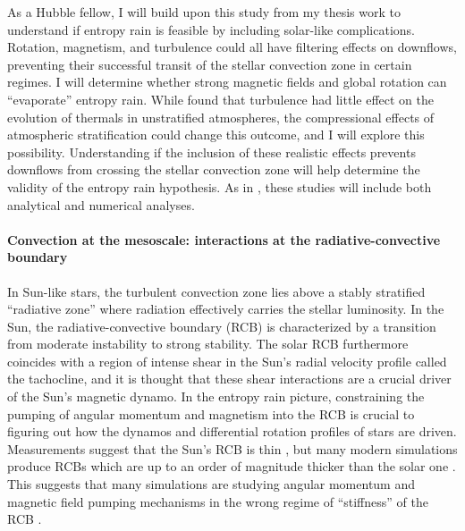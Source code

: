 \documentclass[preprint, hmargin=1in, vmargin=1in]{aastex62}
\begin{document}
As a Hubble fellow, I will build upon this study from my thesis work to understand if entropy rain is feasible by including solar-like complications.
Rotation, magnetism, and turbulence could all have filtering effects on downflows, preventing their successful transit of the stellar convection zone in certain regimes.
I will determine whether strong magnetic fields and global rotation can ``evaporate'' entropy rain.
While \citet{lecoanet&jeevanjee2019} found that turbulence had little effect on the evolution of thermals in unstratified atmospheres, the compressional effects of atmospheric stratification could change this outcome, and I will explore this possibility.
Understanding if the inclusion of these realistic effects prevents downflows from crossing the stellar convection zone will help determine the validity of the entropy rain hypothesis.
As in \citet{andersLB2019}, these studies will include both analytical and numerical analyses.

\paragraph{Convection at the mesoscale: interactions at the radiative-convective boundary}
In Sun-like stars, the turbulent convection zone lies above a stably stratified ``radiative zone'' where radiation effectively carries the stellar luminosity.
In the Sun, the radiative-convective boundary (RCB) is characterized by a transition from moderate instability to strong stability.
The solar RCB furthermore coincides with a region of intense shear in the Sun's radial velocity profile called the tachocline, and it is thought that these shear interactions are a crucial driver of the Sun's magnetic dynamo.
In the entropy rain picture, constraining the pumping of angular momentum and magnetism into the RCB is crucial to figuring out how the dynamos and differential rotation profiles of stars are driven.
Measurements suggest that the Sun's RCB is thin \citep{basu1997}, but many modern simulations produce RCBs which are up to an order of magnitude thicker than the solar one \citep{hotta2017}.
This suggests that many simulations are studying angular momentum and magnetic field pumping mechanisms in the wrong regime of ``stiffness'' of the RCB \citep{couston&all2017}.
\end{document}
